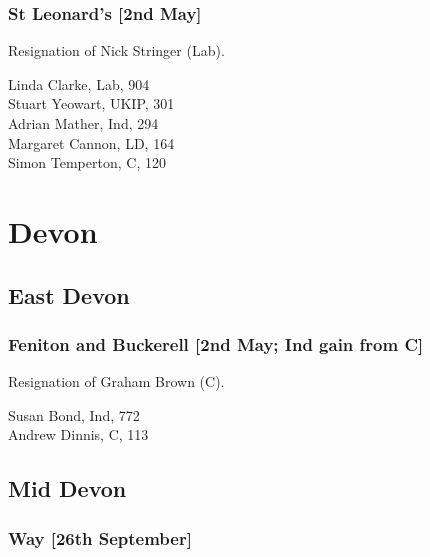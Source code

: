\documentclass[a4paper,openany,10pt]{book}
\begin{document}
\subsubsection*{St Leonard's \hspace*{\fill}\nolinebreak[1]%
\enspace\hspace*{\fill}
[2nd May]}


Resignation of Nick Stringer (Lab).



Linda Clarke, Lab, 904\\
Stuart Yeowart, UKIP, 301\\
Adrian Mather, Ind, 294\\
Margaret Cannon, LD, 164\\
Simon Temperton, C, 120\\


\section{Devon}

\subsection*{East Devon}

\subsubsection*{Feniton and Buckerell \hspace*{\fill}\nolinebreak[1]%
\enspace\hspace*{\fill}
[2nd May; Ind gain from C]}


Resignation of Graham Brown (C).



Susan Bond, Ind, 772\\
Andrew Dinnis, C, 113\\


\subsection*{Mid Devon}

\subsubsection*{Way \hspace*{\fill}\nolinebreak[1]%
\enspace\hspace*{\fill}
[26th September]}
\end{document}

